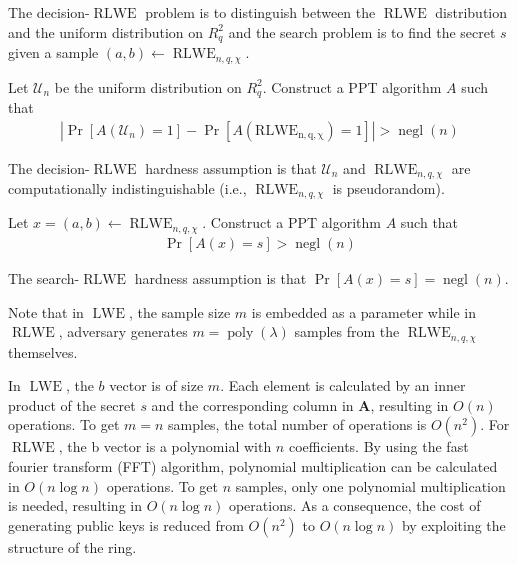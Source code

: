 The decision-$\operatorname{RLWE}$ problem is to distinguish between the $\operatorname{RLWE}$ distribution and the uniform distribution on $R_q^2$ and the search problem is to find the secret $s$ given a sample $(a,b) \leftarrow \operatorname{RLWE}_{n,q,\chi}$.
\begin{definition}
    Let $\mathcal{U}_n$ be the uniform distribution on $R_q^2$. Construct a PPT algorithm $A$ such that 
    \begin{equation*}
        \begin{aligned}
        |\operatorname{Pr}[A(\mathcal{U}_n) = 1] - \operatorname{Pr}[A(\operatorname{RLWE_{n,q,\chi}}) = 1]| > \operatorname{negl}(n)
        \end{aligned}
    \end{equation*}
\end{definition}
The decision-$\operatorname{RLWE}$ hardness assumption is that $\mathcal{U}_n$ and $\operatorname{RLWE}_{n,q,\chi}$ are computationally indistinguishable (i.e., $\operatorname{RLWE}_{n,q,\chi}$ is pseudorandom).
\begin{definition}
    Let $x = (a, b) \leftarrow \operatorname{RLWE}_{n,q,\chi}$. Construct a PPT algorithm $A$ such that 
    \begin{equation*}
        \begin{aligned}
            \operatorname{Pr}[A(x) = s] > \operatorname{negl}(n)
        \end{aligned}
    \end{equation*}
\end{definition}
The search-$\operatorname{RLWE}$ hardness assumption is that $\operatorname{Pr}[A(x) = s] = \operatorname{negl}(n)$.

Note that in $\operatorname{LWE}$, the sample size $m$ is embedded as a parameter while in $\operatorname{RLWE}$, adversary generates $m = \operatorname{poly}(\lambda)$ samples from the $\operatorname{RLWE}_{n,q,\chi}$ themselves.

In $\operatorname{LWE}$, the $b$ vector is of size $m$. Each element is calculated by an inner product of the secret $s$ and the corresponding column in $\textbf{A}$, resulting in $O(n)$ operations. To get $m = n$ samples, the total number of operations is $O(n^2)$. For $\operatorname{RLWE}$, the b vector is a polynomial with $n$ coefficients. By using the fast fourier transform (FFT) algorithm, polynomial multiplication can be calculated in $O(n \log n)$ operations. To get $n$ samples, only one polynomial multiplication is needed, resulting in $O(n \log n)$ operations. As a consequence, the cost of generating public keys is reduced from $O(n^2)$ to $O(n \log n)$ by exploiting the structure of the ring.
